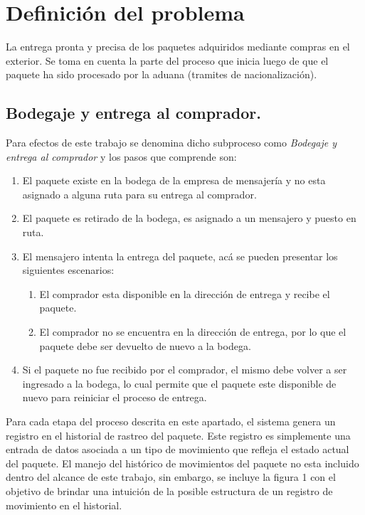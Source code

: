 \documentclass[12pt,a4paper,zed]{article}
\begin{document}
\section{Definición del problema}
La entrega pronta y precisa de los paquetes adquiridos mediante compras en el exterior. Se toma en cuenta la parte del proceso que inicia luego de que el paquete ha sido procesado por la aduana (tramites de nacionalización).
\subsection{Bodegaje y entrega al comprador.}
Para efectos de este trabajo se denomina dicho subproceso como \textit{Bodegaje y entrega al comprador} y los pasos que comprende son:
\begin{enumerate}
\item El paquete existe en la bodega de la empresa de mensajería y no esta asignado a alguna ruta para su entrega al comprador.
\item El paquete es retirado de la bodega, es asignado a un mensajero y puesto en ruta.
\item El mensajero intenta la entrega del paquete, acá se pueden presentar los siguientes escenarios:
\begin{enumerate}
\item El comprador esta disponible en la dirección de entrega y recibe el paquete.
\item El comprador no se encuentra en la dirección de entrega, por lo que el paquete debe ser devuelto de nuevo a la bodega.
\end{enumerate}
\item Si el paquete no fue recibido por el comprador, el mismo debe volver a ser ingresado a la bodega, lo cual permite que el paquete este disponible de nuevo para reiniciar el proceso de entrega.
\end{enumerate}

Para cada etapa del proceso descrita en este apartado, el sistema genera un registro en el historial de rastreo del paquete. Este registro es simplemente una entrada de datos asociada a un tipo de movimiento que refleja el estado actual del paquete. El manejo del histórico de movimientos del paquete no esta incluido dentro del alcance de este trabajo, sin embargo, se incluye la figura 1 con el objetivo de brindar una intuición de la posible estructura de un registro de movimiento en el historial. 

\end{document}
